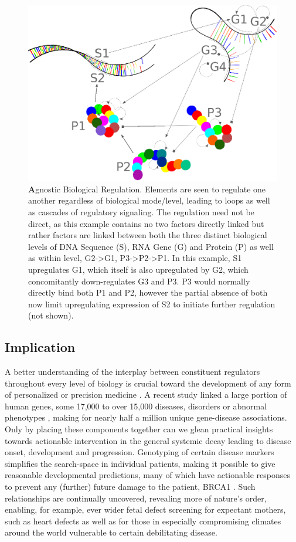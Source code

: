 \begin{figure}%
\centering
\includegraphics[width=1\linewidth]{2/DNA2.eps}
\caption{{\textbf Agnostic Biological Regulation.} Elements are seen to regulate one another regardless of biological mode/level, leading to loops as well as cascades of regulatory signaling. The regulation need not be direct, as this example contains no two factors directly linked but rather factors are linked between both the three distinct biological levels of DNA Sequence (S), RNA Gene (G) and Protein (P) as well as within level, \ie G2->G1, P3->P2->P1. In this example, S1 upregulates G1, which itself is also upregulated by G2, which concomitantly down-regulates G3 and P3. P3 would normally directly bind both P1 and P2, however the partial absence of both now limit upregulating expression of S2 to initiate further regulation (not shown).
}
\label{fig:DNA}
\end{figure}


\subsection{Implication}
\label{sec:practical}
A better understanding of the interplay between constituent regulators throughout every level of biology is crucial toward the development of any form of personalized or precision medicine \citep{barabasi2011network}. A recent study linked a large portion of human genes, some 17,000 to over 15,000 diseases, disorders or abnormal phenotypes \citep{pinero2015disgenet}, making for nearly half a million unique gene-disease associations. Only by placing these components together can we glean practical insights towards actionable intervention in the general systemic decay leading to disease onset, development and progression. Genotyping of certain disease markers simplifies the search-space in individual patients, making it possible to give reasonable developmental predictions, many of which have actionable responses to prevent any (further) future damage to the patient, \eg BRCA1 \citep{lerman1996brca1}. Such relationships are continually uncovered, revealing more of nature's order, enabling, for example, ever wider fetal defect screening for expectant mothers, such as heart defects \citep{hyett1999using} as well as for those in especially compromising climates around the world vulnerable to certain debilitating disease.

